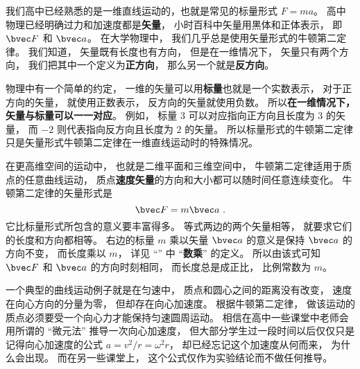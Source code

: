 
\begin{issues}
\issueTODO
\end{issues}


我们高中已经熟悉的是一维直线运动的，也就是常见的标量形式 $F = ma$。 高中物理已经明确过力和加速度都是\textbf{矢量}， 小时百科中矢量用黑体和正体表示， 即 $\bvec F$ 和 $\bvec a$。 在大学物理中， 我们几乎总是使用矢量形式的牛顿第二定律。 我们知道， 矢量既有长度也有方向， 但是在一维情况下， 矢量只有两个方向， 我们把其中一个定义为\textbf{正方向}， 那么另一个就是\textbf{反方向}。

物理中有一个简单的约定， 一维的矢量可以用\textbf{标量}也就是一个实数表示， 对于正方向的矢量， 就使用正数表示， 反方向的矢量就使用负数。 所以\textbf{在一维情况下， 矢量与标量可以一一对应}。 例如， 标量 $3$ 可以对应指向正方向且长度为 $3$ 的矢量， 而 $-2$ 则代表指向反方向且长度为 $2$ 的矢量。 所以标量形式的牛顿第二定律只是矢量形式牛顿第二定律在一维直线运动时的特殊情况。

在更高维空间的运动中， 也就是二维平面和三维空间中， 牛顿第二定律适用于质点的任意曲线运动， 质点\textbf{速度矢量}的方向和大小都可以随时间任意连续变化。 牛顿第二定律的矢量形式是
\begin{equation}\label{eq_New2_3}
\bvec F = m\bvec a~.
\end{equation}
它比标量形式所包含的意义要丰富得多。 等式两边的两个矢量相等， 就要求它们的长度和方向都相等。 右边的标量 $m$ 乘以矢量 $\bvec a$ 的意义是保持 $\bvec a$ 的方向不变， 而长度乘以 $m$， 详见 “” 中 “\textbf{数乘}” 的定义。 所以由该式可知 $\bvec F$ 和 $\bvec a$ 的方向时刻相同， 而长度总是成正比， 比例常数为 $m$。

一个典型的曲线运动例子就是在匀速中， 质点和圆心之间的距离没有改变， 速度在向心方向的分量为零， 但却存在向心加速度。 根据牛顿第二定律， 做该运动的质点必须要受一个向心力才能保持匀速圆周运动。 相信在高中一些课堂中老师会用所谓的 “微元法” 推导一次向心加速度， 但大部分学生过一段时间以后仅仅只是记得向心加速度的公式 $a = v^2/r = \omega^2 r$， 却已经忘记这个加速度从何而来， 为什么会出现。 而在另一些课堂上， 这个公式仅作为实验结论而不做任何推导。

